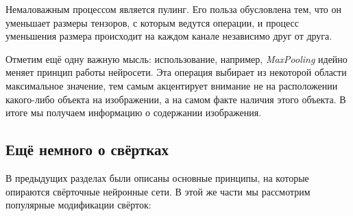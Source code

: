 \documentclass[12pt, fleqn]{article}
\begin{document}
    Немаловажным процессом является пулинг. Его польза обусловлена тем, что
    он уменьшает размеры тензоров, с которым ведутся операции, и процесс
    уменьшения размера происходит на каждом канале независимо друг от друга.

    Отметим ещё одну важную мысль: использование, например, \textit{MaxPooling}
    идейно меняет принцип работы нейросети. Эта операция 
    выбирает из некоторой области максимальное значение, тем самым акцентирует внимание не
    на расположении какого-либо объекта на изображении, а на самом факте наличия
    этого объекта. В итоге мы получаем информацию о содержании изображения.
        
    \subsection{Ещё немного о свёртках}

    В предыдущих разделах были описаны основные принципы, на которые опираются свёрточные нейронные сети. 
    В этой же части мы рассмотрим популярные модификации свёрток:
    
\end{document}
